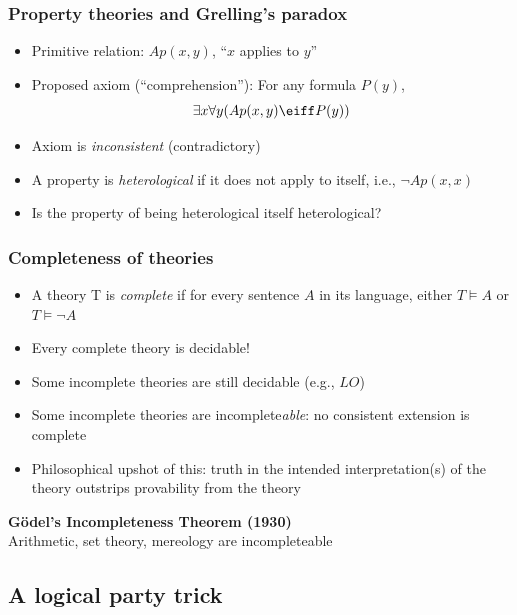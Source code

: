 \begin{frame}
    \frametitle{Property theories and Grelling's paradox}

\begin{itemize}
\item Primitive relation: $Ap(x ,y)$, ``$x$ applies to $y$''
\item Proposed axiom (``comprehension''): For any formula $P(y)$,
\[
\exists x\forall y(Ap(x, y) \eiff P(y))
\]
\item Axiom is \emph{inconsistent} (contradictory)
\item A property is \emph{heterological} if it does not apply to itself, i.e., $
 \lnot Ap(x, x)$
\item Is the property of being heterological itself heterological?
\end{itemize}
\begin{fitchproof}
\end{fitchproof}
\end{frame}

\begin{frame}
    \frametitle{Completeness of theories}

\begin{itemize}
\item A theory T is \emph{complete} if for every sentence $A$ in its language,
either $ T \models A$ or $ T \models \lnot A$
\item Every complete theory is decidable!
\item Some incomplete theories are still decidable (e.g., $LO$)
\item Some incomplete theories are incomplete\emph{able}: no consistent extension is complete
\item Philosophical upshot of this: truth in the intended interpretation(s) of the theory outstrips provability from the theory
\end{itemize}
\textbf{G\"odel's Incompleteness Theorem (1930)}\\
Arithmetic, set theory, mereology are incompleteable

\end{frame}


\subsection{A logical party trick}


